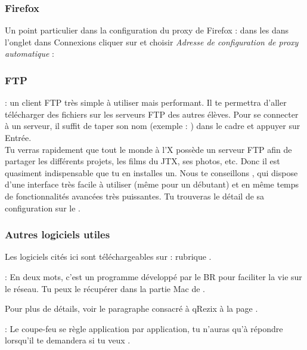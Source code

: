 \subsubsection{Firefox}
Un point particulier dans la configuration du proxy de Firefox : dans les  dans l'onglet  dans Connexions cliquer sur  et choisir \emph{Adresse de configuration de proxy automatique} : 

\clearpage

\subsubsection{FTP}

  : un client FTP très simple à utiliser mais performant. Il te permettra d'aller télécharger des fichiers sur les serveurs FTP des autres élèves.
Pour se connecter à un serveur, il suffit de taper son nom (exemple : ) dans le cadre  et appuyer sur Entrée.\\
Tu verras rapidement que tout le monde à l'X possède un serveur FTP afin de partager les différents projets, les films du JTX, ses photos, etc. Donc il est quasiment indispensable que tu en installes un. Nous te conseillons , qui dispose d'une interface très facile à utiliser (même pour un débutant) et en même temps de fonctionnalités avancées très puissantes. Tu trouveras le détail de sa configuration sur le .

\subsubsection{Autres logiciels utiles}

Les logiciels cités ici sont téléchargeables sur  : rubrique .

 \noindent{} : En deux mots, c'est un programme développé par le BR pour faciliter la vie sur le réseau. Tu peux le récupérer dans la partie Mac de \xshare.

\noindent Pour plus de détails, voir le paragraphe consacré à qRezix à la page \pageref{qrezix}.

\noindent {} : Le coupe-feu se règle application par application, tu n'auras qu'à répondre  lorsqu'il te demandera si tu veux .

